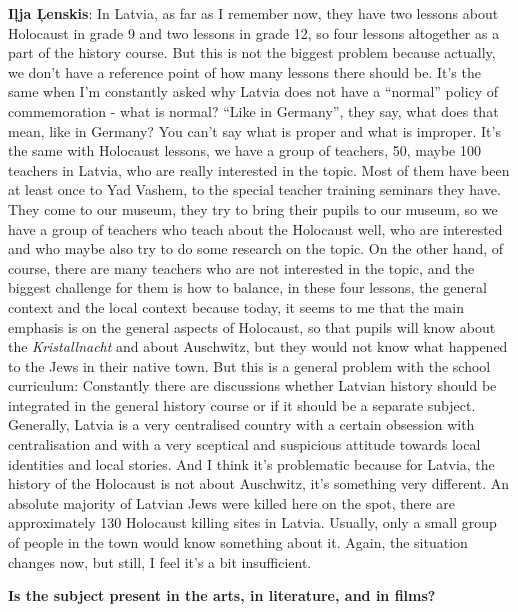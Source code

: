 \textbf{Iļja Ļenskis}: In Latvia, as far as I remember now, they have two lessons about Holocaust in grade 9 and two lessons in grade 12, so four lessons altogether as a part of the history course. But this is not the biggest problem because actually, we don’t have a reference point of how many lessons there should be. It's the same when I’m constantly asked why Latvia does not have a ``normal'' policy of commemoration - what is normal? ``Like in Germany'', they say, what does that mean, like in Germany?  You can’t say what is proper and what is improper. It's the same with Holocaust lessons, we have a group of teachers, 50, maybe 100 teachers in Latvia, who are really interested in the topic. Most of them have been at least once to Yad Vashem, to the special teacher training seminars they have. They come to our museum, they try to bring their pupils to our museum, so we have a group of teachers who teach about the Holocaust well, who are interested and who maybe also try to do some research on the topic. On the other hand, of course, there are many teachers who are not interested in the topic, and the biggest challenge for them is how to balance, in these four lessons, the general context and the local context because today, it seems to me that the main emphasis is on the general aspects of Holocaust, so that pupils will know about the \textit{Kristallnacht} and about Auschwitz, but they would not know what happened to the Jews in their native town. But this is a general problem with the school curriculum: Constantly there are discussions whether Latvian history should be integrated in the general history course or if it should be a separate subject.\\
Generally, Latvia is a very centralised country with a certain obsession with centralisation and with a very sceptical and suspicious attitude towards local identities and local stories. And I think it’s problematic because for Latvia, the history of the Holocaust is not about Auschwitz, it’s something very different. An absolute majority of Latvian Jews were killed here on the spot, there are approximately 130 Holocaust killing sites in Latvia. Usually, only a small group of people in the town would know something about it. Again, the situation changes now, but still, I feel it’s a bit insufficient. 

\textbf{Is the subject present in the arts, in literature, and in films?} 

